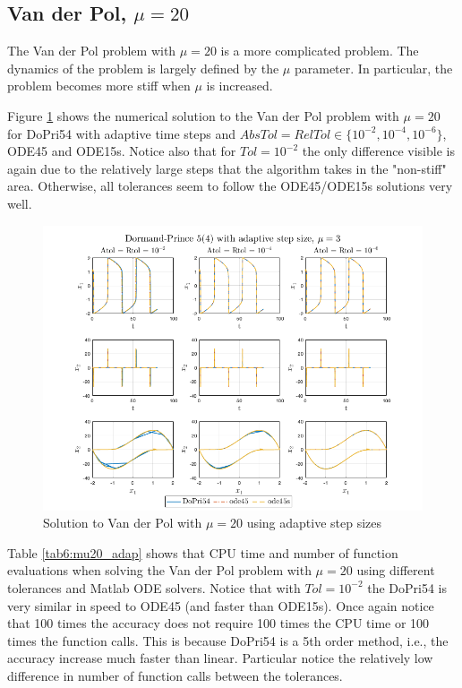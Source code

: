 \subsection{Van der Pol, $\mu = 20$}
The Van der Pol problem with $\mu = 20$ is a more complicated problem. The dynamics of the problem is largely defined by the $\mu$ parameter. In particular, the problem becomes more stiff when $\mu$ is increased.

Figure \ref{fig6:adap_mu20} shows the numerical solution to the Van der Pol problem with $\mu = 20$ for DoPri54 with adaptive time steps and $AbsTol=RelTol \in \{10^{-2}, 10^{-4}, 10^{-6}\}$, ODE45 and ODE15s. Notice also that for $Tol = 10^{-2}$ the only difference visible is again due to the relatively large steps that the algorithm takes in the "non-stiff" area. Otherwise, all tolerances seem to follow the ODE45/ODE15s solutions very well.

\begin{figure}[H]
    \centering
    \includegraphics[width=\textwidth]{graphics/opg6/mu20_adap.png}
    \caption{Solution to Van der Pol with $\mu = 20$ using adaptive step sizes}
    \label{fig6:adap_mu20}
\end{figure}

Table \ref{tab6:mu20_adap} shows that CPU time and number of function evaluations when solving the Van der Pol problem with $\mu = 20$ using different tolerances and Matlab ODE solvers. Notice that with $Tol = 10^{-2}$ the DoPri54 is very similar in speed to ODE45 (and faster than ODE15s). Once again notice that 100 times the accuracy does not require 100 times the CPU time or 100 times the function calls. This is because DoPri54 is a 5th order method, i.e., the accuracy increase much faster than linear. Particular notice the relatively low difference in number of function calls between the tolerances.

